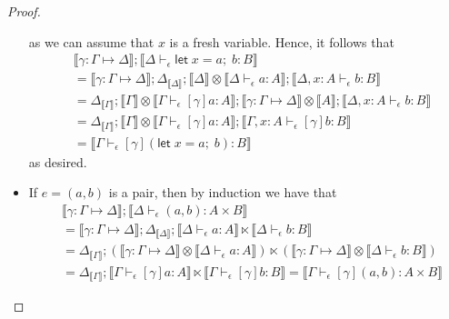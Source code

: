 \documentclass[acmsmall,screen,review]{acmart}
\newcommand{\ms}[1]{\ensuremath{\mathsf{#1}}}
\newcommand{\letexpr}[3]{\ensuremath{\ms{let}\;#1 = #2;\;#3}}
\newcommand{\bhyp}[2]{#1 : #2}
\newcommand{\hasty}[4]{#1 \vdash_{#2} #3: {#4}}
\newcommand{\issubst}[3]{#1: #2 \mapsto #3}
\newcommand{\dnt}[1]{\llbracket{#1}\rrbracket}
\begin{document}
\begin{proof}
\begin{itemize}[leftmargin=*]
\begin{equation}
    \end{equation}
    as we can assume that $x$ is a fresh variable. Hence, it follows that
    \begin{equation}
      \begin{aligned}
        & \dnt{\issubst{\gamma}{\Gamma}{\Delta}} 
        ; \dnt{\hasty{\Delta}{\epsilon}{\letexpr{x}{a}{b}}{B}} \\
        &= \dnt{\issubst{\gamma}{\Gamma}{\Delta}}
        ; \Delta_{\dnt{\Delta}} ; \dnt{\Delta} \otimes \dnt{\hasty{\Delta}{\epsilon}{a}{A}}
        ; \dnt{\hasty{\Delta, \bhyp{x}{A}}{\epsilon}{b}{B}} \\
        &= \Delta_{\dnt{\Gamma}} 
        ; \dnt{\Gamma} 
          \otimes \dnt{\hasty{\Gamma}{\epsilon}{[\gamma]a}{A}}
        ; \dnt{\issubst{\gamma}{\Gamma}{\Delta}} \otimes \dnt{A}
        ; \dnt{\hasty{\Delta, \bhyp{x}{A}}{\epsilon}{b}{B}} \\
        &= \Delta_{\dnt{\Gamma}}
        ; \dnt{\Gamma} \otimes \dnt{\hasty{\Gamma}{\epsilon}{[\gamma]a}{A}}
        ; \dnt{\hasty{\Gamma, \bhyp{x}{A}}{\epsilon}{[\gamma]b}{B}} \\
        &= \dnt{\hasty{\Gamma}{\epsilon}{[\gamma](\letexpr{x}{a}{b})}{B}}
      \end{aligned}
    \end{equation}
    as desired.
    \item If $e = (a, b)$ is a pair, then by induction we have that
    \begin{equation}
      \begin{aligned}
      &\dnt{\issubst{\gamma}{\Gamma}{\Delta}} ; \dnt{\hasty{\Delta}{\epsilon}{(a, b)}{A \times B}} 
      \\
      &= \dnt{\issubst{\gamma}{\Gamma}{\Delta}} 
        ; \Delta_{\dnt{\Delta}} 
        ; \dnt{\hasty{\Delta}{\epsilon}{a}{A}} \ltimes \dnt{\hasty{\Delta}{\epsilon}{b}{B}}
      \\
      &= \Delta_{\dnt{\Gamma}} ; 
        (\dnt{\issubst{\gamma}{\Gamma}{\Delta}} \otimes \dnt{\hasty{\Delta}{\epsilon}{a}{A}})
        \ltimes 
        (\dnt{\issubst{\gamma}{\Gamma}{\Delta}} \otimes \dnt{\hasty{\Delta}{\epsilon}{b}{B}})
      \\
      &= \Delta_{\dnt{\Gamma}} ; 
        \dnt{\hasty{\Gamma}{\epsilon}{[\gamma]a}{A}} 
        \ltimes \dnt{\hasty{\Gamma}{\epsilon}{[\gamma]b}{B}}
      = \dnt{\hasty{\Gamma}{\epsilon}{[\gamma](a, b)}{A \times B}}
      \end{aligned}
    \end{equation}

\end{itemize}
\end{proof}
\end{document}
